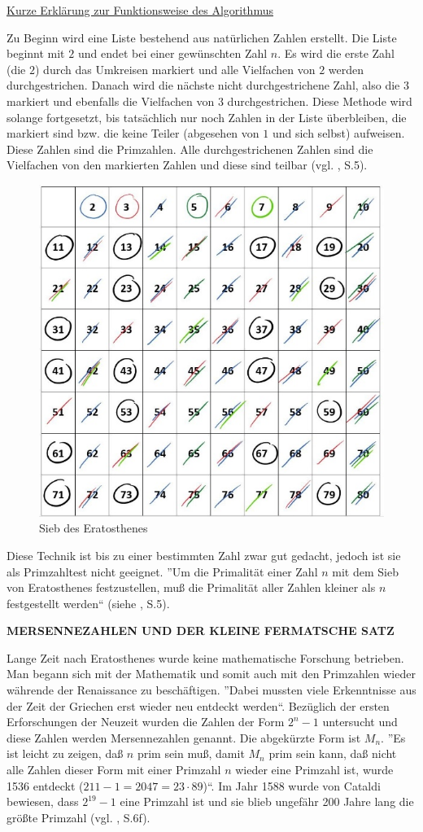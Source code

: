 \underline{Kurze Erklärung zur Funktionsweise des Algorithmus}

Zu Beginn wird eine Liste bestehend aus natürlichen Zahlen
erstellt. Die Liste beginnt mit $2$ und endet bei einer
gewünschten Zahl $n$. Es wird die erste Zahl (die $2$)
durch das Umkreisen markiert und alle Vielfachen von $2$
werden durchgestrichen. Danach wird die nächste nicht
durchgestrichene Zahl, also die $3$ markiert und ebenfalls
die Vielfachen von $3$ durchgestrichen. Diese Methode wird
solange fortgesetzt, bis tatsächlich nur noch Zahlen in der
Liste überbleiben, die markiert sind bzw. die keine Teiler
(abgesehen von $1$ und sich selbst) aufweisen. Diese Zahlen
sind die Primzahlen. Alle durchgestrichenen Zahlen sind die
Vielfachen von den markierten Zahlen und diese sind teilbar
(vgl. \cite{sasgabor}, S.5).

\begin{figure}[H]
  \centering
  \includegraphics[width=.5\linewidth]{./images/sieb.jpg}
  \caption[Das Sieb des Eratosthenes. Abgerufen am 2021 von Serlo, die freie Lernplattform:
https://de.serlo.org/mathe/96712/das-sieb-des-eratosthenes]{Sieb des Eratosthenes}
  \label{fig:sieb_eratosthenes}
\end{figure}
\vspace{.2cm}

Diese Technik ist bis zu einer bestimmten Zahl zwar gut
gedacht, jedoch ist sie als Primzahltest nicht geeignet.
''Um die Primalität einer Zahl $n$ mit dem Sieb von
Eratosthenes festzustellen, muß die Primalität aller
Zahlen kleiner als $n$ festgestellt werden``
(siehe \cite{sasgabor}, S.5).
\vspace*{.4cm}

\textbf{MERSENNEZAHLEN UND DER KLEINE FERMATSCHE SATZ}

Lange Zeit nach Eratosthenes wurde keine mathematische
Forschung betrieben. Man begann sich mit der Mathematik
und somit auch mit den Primzahlen wieder währende der 
Renaissance zu beschäftigen. ''Dabei mussten viele
Erkenntnisse aus der Zeit der Griechen erst wieder neu
entdeckt werden``. Bezüglich der ersten Erforschungen
der Neuzeit wurden die Zahlen der Form $2^{n}-1$
untersucht und diese Zahlen werden Mersennezahlen genannt.
Die abgekürzte Form ist $M_n$. ''Es ist leicht zu zeigen,
daß $n$ prim sein muß, damit $M_n$ prim sein kann, daß
nicht alle Zahlen dieser Form mit einer Primzahl $n$
wieder eine Primzahl ist, wurde 1536 entdeckt 
($211 - 1 = 2047 = 23 \cdot 89$)``. Im Jahr 1588 wurde von
Cataldi bewiesen, dass $2^{19} - 1$ eine Primzahl ist
und sie blieb ungefähr 200 Jahre lang die größte Primzahl
(vgl. \cite{sasgabor}, S.6f).

